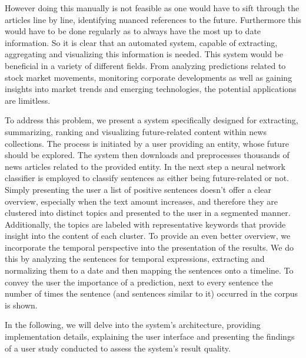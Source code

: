 \documentclass[sigconf]{acmart}
\begin{document}
\noindent However doing this manually is not feasible as one would have to sift through the articles line by line, identifying nuanced references to the future. Furthermore this would have to be done regularly as to always have the most up to date information. So it is clear that an automated system, capable of extracting, aggregating and visualizing this information is needed. This system would be beneficial in a variety of different fields. From analyzing predictions related to stock market movements, monitoring corporate developments as well as gaining insights into market trends and emerging technologies, the potential applications are limitless.

\noindent To address this problem, we present a system specifically designed for extracting, summarizing, ranking and visualizing future-related content within news collections. The process is initiated by a user providing an entity, whose future should be explored. The system then downloads and preprocesses thousands of news articles related to the provided entity. In the next step a neural network classifier is employed to classify sentences as either being future-related or not. Simply presenting the user a list of positive sentences doesn't offer a clear overview, especially when the text amount increases, and therefore they are clustered into distinct topics and presented to the user in a segmented manner. Additionally, the topics are labeled with representative keywords that provide insight into the content of each cluster. To provide an even better overview, we incorporate the temporal perspective into the presentation of the results. We do this by analyzing the sentences for temporal expressions, extracting and normalizing them to a date and then mapping the sentences onto a timeline. To convey the user the importance of a prediction, next to every sentence the number of times the sentence (and sentences similar to it) occurred in the corpus is shown.

\noindent In the following, we will delve into the system's architecture, providing implementation details, explaining the user interface and presenting the findings of a user study conducted to assess the system's result quality.

\end{document}
